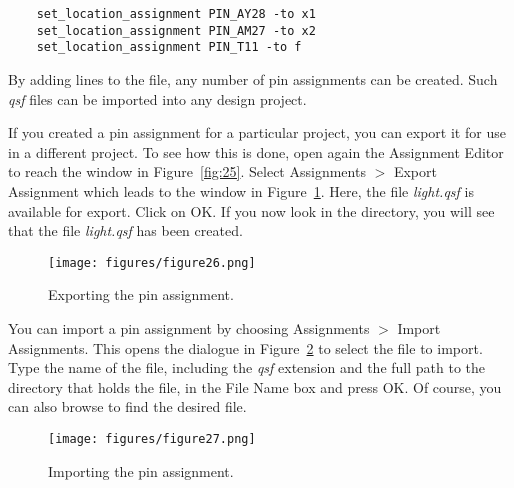 \begin{center}
\begin{verbatim}
	set_location_assignment PIN_AY28 -to x1
	set_location_assignment PIN_AM27 -to x2
	set_location_assignment PIN_T11 -to f
\end{verbatim}
\end{center}

\noindent
By adding lines to the file, any number of pin assignments can be created.
Such {\it qsf} files can be imported into any design project.

If you created a pin assignment for a particular project, you can export it
for use in a different project. To see how this is done, open again the Assignment Editor
to reach the window in Figure~\ref{fig:25}. Select {\sf Assignments $>$ Export Assignment} which leads to the
window in Figure~\ref{fig:26}. Here, the file {\it light.qsf} is available for export.
Click on {\sf OK}.
If you now look in the directory, you will see that
the file {\it light.qsf} has been created.
 
\begin{figure}[H]
   \begin{center}
      \texttt{[image: figures/figure26.png]}
   \caption{Exporting the pin assignment.} 
	 \label{fig:26}
	 \end{center}
\end{figure}

You can import a pin assignment by choosing {\sf Assignments $>$ Import Assignments}. 
This opens the dialogue in Figure~\ref{fig:27} to select the file to import. 
Type the name of the file, including the {\it qsf} extension and the full path
to the directory that holds the file, in the File Name box and press {\sf OK}.
Of course, you can also browse to find the desired file.
 
\begin{figure}[H]
   \begin{center}
      \texttt{[image: figures/figure27.png]}
   \caption{Importing the pin assignment.} 
	 \label{fig:27}
	 \end{center}
\end{figure}
